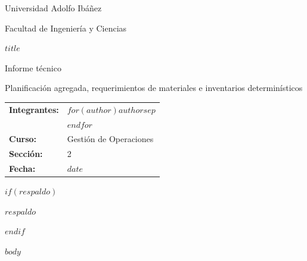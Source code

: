 \documentclass[10pt,letterpaper]{article}
\begin{document}
\begin{titlepage}
\centering
{\large Universidad Adolfo Ibáñez\par}
{Facultad de Ingeniería y Ciencias\par}
\vspace{0.25\textheight}
{\LARGE\bfseries $title$\par}
\vspace{10pt}
{\large Informe técnico\par}
\vspace{4pt}
{Planificación agregada, requerimientos de materiales e inventarios determinísticos\par}
\vfill
\begin{flushleft}
\begin{tabular}{@{}ll@{}}
\textbf{Integrantes:} & $for(author)$$author$$sep$ \\ & $endfor$ \\[8pt]
\textbf{Curso:} & Gestión de Operaciones \\
\textbf{Sección:} & 2 \\
\textbf{Fecha:} & $date$ \\
\end{tabular}
\end{flushleft}
\vspace{20pt}
$if(respaldo)$
\begin{flushleft}
\footnotesize
$respaldo$
\end{flushleft}
$endif$
\end{titlepage}

\setcounter{page}{1}
$body$
\end{document}
